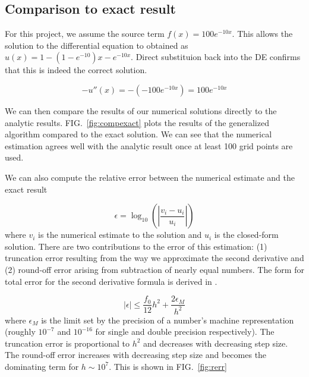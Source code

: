 \documentclass[10pt,showpacs,preprintnumbers,footinbib,amsmath,amssymb,aps,prl,twocolumn,groupedaddress,superscriptaddress,showkeys]{revtex4-1}
\begin{document}
\subsection{Comparison to exact result}

For this project, we assume the source term $f(x) = 100 e ^{-10x}$.
This allows the solution to the differential equation to obtained as
$u(x) = 1 - (1 - e^{-10})x - e^{-10x}$. Direct substituion back into
the DE confirms that this is indeed the correct solution.

\begin{equation*}
	- u''(x) = - (-100 e^{-10x}) = 100 e^{-10x}
\end{equation*}

We can then compare the results of our numerical solutions directly
to the analytic results. FIG.~\ref{fig:compexact} plots the results
of the generalized algorithm compared to the exact solution. We can
see that the numerical estimation agrees well with the analytic
result once at least 100 grid points are used.

We can also compute the relative error between the numerical estimate
and the exact result

\begin{equation*}
	\epsilon = \log _{10} \left ( \left | \frac{v_i - u_i}{u_i}
	\right | \right )
\end{equation*}
where $v_i$ is the numerical estimate to the solution and $u_i$ is
the closed-form solution. There are two contributions to the error
of this estimation: (1) truncation error resulting from the way we
approximate the second derivative and (2) round-off error arising
from subtraction of nearly equal numbers. The form for total error
for the second derivative formula is derived in \citep{Mslides}.

\begin{equation*}
	|\epsilon | \leq \frac{f_0}{12} h^2 + \frac{2 \epsilon _M}{h^2} 
\end{equation*}
where $\epsilon _M$ is the limit set by the precision of a number's
machine representation (roughly $10^{-7}$ and $10^{-16}$ for single
and double precision respectively). The truncation error is
proportional to $h^2$ and decreases with decreasing step size. The
round-off error increases with decreasing step size and becomes the
dominating term for $h\sim 10^7$. This is shown in FIG.~\ref{fig:rerr}
\end{document}

